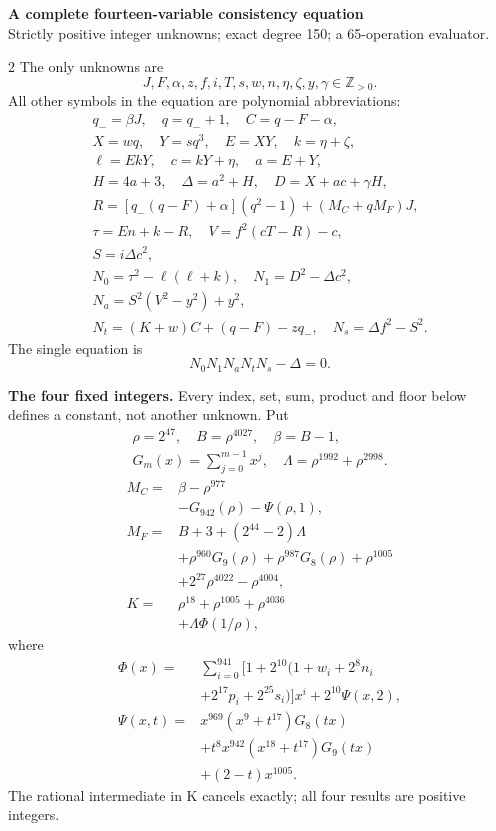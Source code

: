 \documentclass[10pt]{article}
\begin{document}
\begin{center}
{\large\bfseries A complete fourteen-variable consistency equation}\\[-1pt]
{\small Strictly positive integer unknowns; exact degree 150; a 65-operation evaluator.}
\end{center}\vspace{-8pt}
\begin{multicols}{2}
\fontsize{9}{9.5}\selectfont
The only unknowns are
\[
J,F,\alpha,z,f,i,T,s,w,n,\eta,\zeta,y,\gamma\in\mathbb Z_{>0}.
\]
All other symbols in the equation are polynomial abbreviations:
\[
\begin{gathered}
q_-=\beta J,\quad q=q_-+1,\quad C=q-F-\alpha,\\
X=wq,\quad Y=sq^3,\quad E=XY,\quad k=\eta+\zeta,\\
\ell=EkY,\quad c=kY+\eta,\quad a=E+Y,\\
H=4a+3,\quad\Delta=a^2+H,\quad D=X+ac+\gamma H,\\
R=[q_-(q-F)+\alpha](q^2-1)+(M_C+qM_F)J,\\
\tau=En+k-R,\quad V=f^2(cT-R)-c,\\
S=i\Delta c^2,\\
N_0=\tau^2-\ell(\ell+k),\quad N_1=D^2-\Delta c^2,\\
N_a=S^2(V^2-y^2)+y^2,\\
N_t=(K+w)C+(q-F)-zq_-,\quad N_s=\Delta f^2-S^2.
\end{gathered}
\]
The single equation is
\[
\boxed{N_0N_1N_aN_tN_s-\Delta=0.}
\]

\textbf{The four fixed integers.}
Every index, set, sum, product and floor below defines a constant, not
another unknown. Put
\[
\begin{gathered}
\rho=2^{47},\quad B=\rho^{4027},\quad\beta=B-1,\\
G_m(x)=\sum_{j=0}^{m-1}x^j,\quad
\Lambda=\rho^{1992}+\rho^{2998}.
\end{gathered}
\]
\begin{align*}
M_C={}&\beta-\rho^{977}\\
&-G_{942}(\rho)-\Psi(\rho,1),\\
M_F={}&B+3+(2^{44}-2)\Lambda\\
&+\rho^{960}G_9(\rho)+\rho^{987}G_8(\rho)
  +\rho^{1005}\\
&+2^{27}\rho^{4022}-\rho^{4004},\\
K={}&\rho^{18}+\rho^{1005}+\rho^{4036}\\
&+\Lambda\Phi(1/\rho),
\end{align*}
where
\[
\begin{split}
\Phi(x)={}&\sum_{i=0}^{941}[1+2^{10}(1+w_i+2^8n_i\\
&+2^{17}p_i+2^{25}s_i)]x^i+2^{10}\Psi(x,2),\\
\Psi(x,t)={}&x^{969}(x^9+t^{17})G_8(tx)\\
&+t^8x^{942}(x^{18}+t^{17})G_9(tx)\\
&+(2-t)x^{1005}.
\end{split}
\]
The rational intermediate in K cancels exactly; all four results are positive integers.


\end{multicols}
\end{document}
